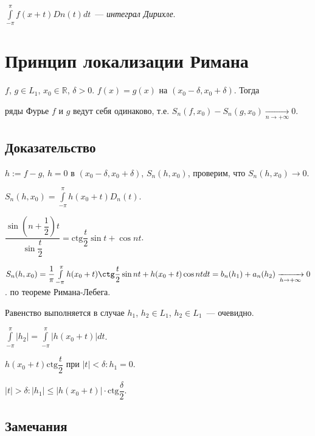 \documentclass{article}
\begin{document}
        $\int\limits^{\pi}_{-\pi} f(x + t) Dn(t) dt$~--- \textit{интеграл Дирихле}.
    
    \newpage
    
    \section{Принцип локализации Римана}
    
        $f$, $g \in L_1$, $x_0 \in \mathbb{R}$, $\delta > 0$. $f(x) = g(x)$ на $(x_0 - \delta, x_0 + \delta)$. Тогда
        
        ряды Фурье $f$ и $g$ ведут себя одинаково, т.е. $S_n(f, x_0) - S_n(g, x_0) \xrightarrow[n \rightarrow +\infty]{} 0$.
        
        \subsection{Доказательство}
        
            $h := f - g$, $h = 0$ в $(x_0 - \delta, x_0 + \delta)$, $S_n(h, x_0)$, проверим, что $S_n(h, x_0) \rightarrow 0$.
        
            $S_n(h, x_0) = \int\limits^{\pi}_{-\pi} h(x_0 + t) D_n(t)$.
        
            $\dfrac{\sin \left(n + \dfrac{1}{2} \right) t}{\sin \dfrac{t}{2}} = \mathrm{ctg} \dfrac{t}{2} \sin{t} + \cos {nt}$.
        
            $S_n(h, x_0) = \dfrac{1}{\pi} \int\limits^{\pi}_{-\pi} h(x_0 + t) \ctg \dfrac{t}{2} \sin {nt} + h(x_0 + t) \cos {nt} dt = b_n(h_1) + a_n(h_2) \xrightarrow[h \rightarrow +\infty]{} 0$. по теореме Римана-Лебега.
        
            Равенство выполняется в случае $h_1$, $h_2 \in L_1$, $h_2 \in L_1$~--- очевидно.
        
            $\int\limits^{\pi}_{-\pi} |h_2| = \int\limits^{\pi}_{-\pi} | h(x_0 + t) | dt$.
        
            $h(x_0 + t) \mathrm{ctg} \dfrac{t}{2}$ при $|t| < \delta : h_1 = 0$.
        
            $|t| > \delta : |h_1| \leqslant |h(x_0 + t)| \cdot \mathrm{ctg} \dfrac{\delta}{2}$.
        
            \subsection{Замечания}
    
\end{document}
